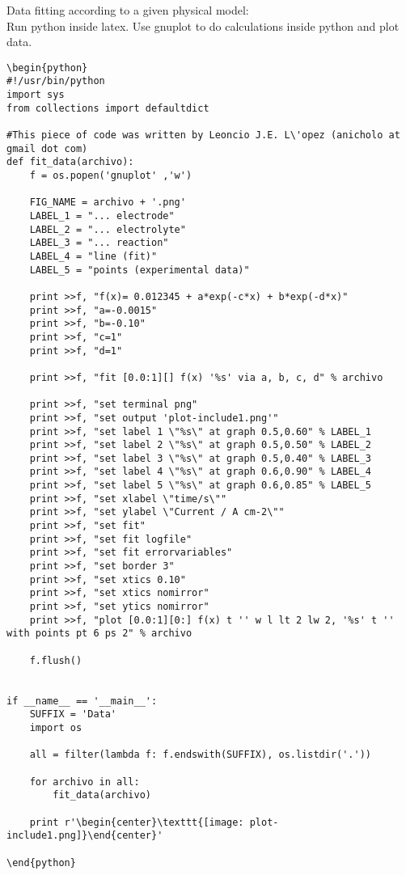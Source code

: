\documentclass[a4paper]{article}
\begin{document}
Data fitting according to a given physical model:\\
Run python inside latex. Use gnuplot to do calculations inside python and plot data.

\begin{verbatim}
\begin{python}
#!/usr/bin/python
import sys
from collections import defaultdict

#This piece of code was written by Leoncio J.E. L\'opez (anicholo at gmail dot com)
def fit_data(archivo):
    f = os.popen('gnuplot' ,'w')

    FIG_NAME = archivo + '.png'
    LABEL_1 = "... electrode"
    LABEL_2 = "... electrolyte"
    LABEL_3 = "... reaction"
    LABEL_4 = "line (fit)"
    LABEL_5 = "points (experimental data)"

    print >>f, "f(x)= 0.012345 + a*exp(-c*x) + b*exp(-d*x)"
    print >>f, "a=-0.0015"
    print >>f, "b=-0.10"
    print >>f, "c=1"
    print >>f, "d=1"

    print >>f, "fit [0.0:1][] f(x) '%s' via a, b, c, d" % archivo

    print >>f, "set terminal png"
    print >>f, "set output 'plot-include1.png'"
    print >>f, "set label 1 \"%s\" at graph 0.5,0.60" % LABEL_1
    print >>f, "set label 2 \"%s\" at graph 0.5,0.50" % LABEL_2
    print >>f, "set label 3 \"%s\" at graph 0.5,0.40" % LABEL_3
    print >>f, "set label 4 \"%s\" at graph 0.6,0.90" % LABEL_4
    print >>f, "set label 5 \"%s\" at graph 0.6,0.85" % LABEL_5
    print >>f, "set xlabel \"time/s\""
    print >>f, "set ylabel \"Current / A cm-2\""
    print >>f, "set fit"
    print >>f, "set fit logfile"
    print >>f, "set fit errorvariables"
    print >>f, "set border 3"
    print >>f, "set xtics 0.10"
    print >>f, "set xtics nomirror"
    print >>f, "set ytics nomirror"
    print >>f, "plot [0.0:1][0:] f(x) t '' w l lt 2 lw 2, '%s' t '' with points pt 6 ps 2" % archivo

    f.flush()


if __name__ == '__main__':
    SUFFIX = 'Data'
    import os

    all = filter(lambda f: f.endswith(SUFFIX), os.listdir('.'))

    for archivo in all:
        fit_data(archivo)

    print r'\begin{center}\texttt{[image: plot-include1.png]}\end{center}'

\end{python}
\end{verbatim}
\end{document}
